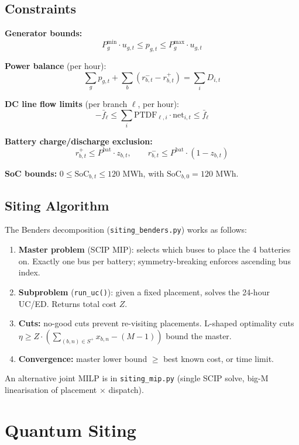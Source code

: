 \documentclass[11pt,a4paper]{article}
\begin{document}
\subsection{Constraints}

\textbf{Generator bounds:}
\[
  P_g^{\min} \cdot u_{g,t} \le p_{g,t} \le P_g^{\max} \cdot u_{g,t}
\]

\textbf{Power balance} (per hour):
\[
  \sum_g p_{g,t} + \sum_b (r^-_{b,t} - r^+_{b,t}) = \sum_i D_{i,t}
\]

\textbf{DC line flow limits} (per branch $\ell$, per hour):
\[
  -\bar{f}_\ell \le \sum_i \mathrm{PTDF}_{\ell,i} \cdot \mathrm{net}_{i,t} \le \bar{f}_\ell
\]

\textbf{Battery charge/discharge exclusion:}
\[
  r^+_{b,t} \le P^{\mathrm{bat}} \cdot z_{b,t}, \qquad r^-_{b,t} \le P^{\mathrm{bat}} \cdot (1 - z_{b,t})
\]

\textbf{SoC bounds:} $0 \le \mathrm{SoC}_{b,t} \le 120$ MWh, with $\mathrm{SoC}_{b,0} = 120$ MWh.

\subsection{Siting Algorithm}

The Benders decomposition (\texttt{siting\_benders.py}) works as follows:
\begin{enumerate}
  \item \textbf{Master problem} (SCIP MIP): selects which buses to place the 4 batteries on.
        Exactly one bus per battery; symmetry-breaking enforces ascending bus index.
  \item \textbf{Subproblem} (\texttt{run\_uc()}): given a fixed placement, solves the 24-hour UC/ED.
        Returns total cost $Z$.
  \item \textbf{Cuts:} no-good cuts prevent re-visiting placements. L-shaped optimality cuts
        $\eta \ge Z \cdot (\sum_{(b,n) \in S^+} x_{b,n} - (M-1))$ bound the master.
  \item \textbf{Convergence:} master lower bound $\ge$ best known cost, or time limit.
\end{enumerate}

An alternative joint MILP is in \texttt{siting\_mip.py} (single SCIP solve, big-M
linearisation of placement $\times$ dispatch).

\section{Quantum Siting}
\end{document}
